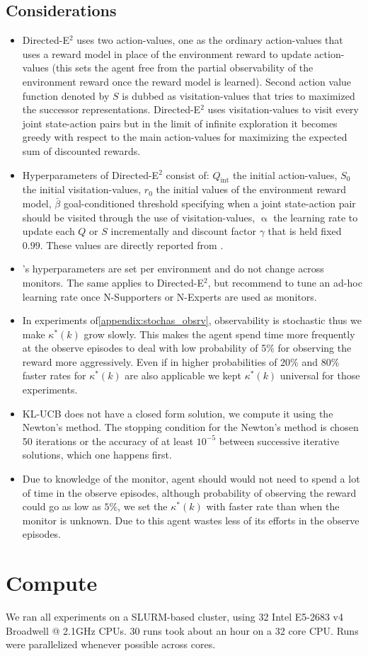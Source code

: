 \subsection{Considerations}
%
\begin{itemize}
    \item Directed-E$^2$ uses two action-values, one as the ordinary action-values that uses a reward model in place of the environment reward to update action-values (this sets the agent free from the partial observability of the environment reward once the reward model is learned). Second action value function denoted by $S$ is dubbed as visitation-values that tries to maximized the successor representations. Directed-E$^2$ uses visitation-values to visit every joint state-action pairs but in the limit of infinite exploration it becomes greedy with respect to the main action-values for maximizing the expected sum of discounted rewards.
    \item Hyperparameters of Directed-E$^2$ consist of: $Q_{\text{int}}$ the initial action-values, $S_0$ the initial visitation-values, $r_0$ the initial values of the environment reward model, $\bar{\beta}$ goal-conditioned threshold specifying when a joint state-action pair should be visited through the use of visitation-values, $\upalpha$ the learning rate to update each $Q$ or $S$ incrementally and discount factor $\gamma$ that is held fixed $0.99$.  These values are directly reported from \citet{parisi2024beyond}.
    \item \thealgo's hyperparameters are set per environment and do not change across monitors. The same applies to Directed-E$^2$, but \citet{parisi2024beyond} recommend to tune an ad-hoc learning rate once N-Supporters or N-Experts are used as monitors.
    \item In experiments of\cref{appendix:stochas_obsrv}, observability is stochastic thus we make $\kappa^*(k)$ grow slowly. This makes the agent spend time more frequently at the observe episodes to deal with low probability of 5\% for observing the reward more aggressively. Even if in higher probabilities of 20\% and 80\% faster rates for $\kappa^{*}(k)$ are also applicable we kept $\kappa^{*}(k)$ universal for those experiments.
    \item KL-UCB does not have a closed form solution, we compute it using the Newton's method. The stopping condition for the Newton's method is chosen 50 iterations or the accuracy of at least $10^{-5}$ between successive iterative solutions, which one happens first.
    \item Due to knowledge of the monitor, agent should would not need to spend a lot of time in the observe episodes, although probability of observing the reward could go as low as $5\%$, we set the $\kappa^*(k)$ with faster rate than when the monitor is unknown. Due to this agent wastes less of its efforts in the observe episodes.
\end{itemize}
%
\section{Compute}
We ran all experiments on a SLURM-based cluster, using 32 Intel E5-2683 v4 Broadwell @ 2.1GHz CPUs. 30 runs took about an hour on a 32 core CPU. Runs were parallelized whenever possible across cores.
